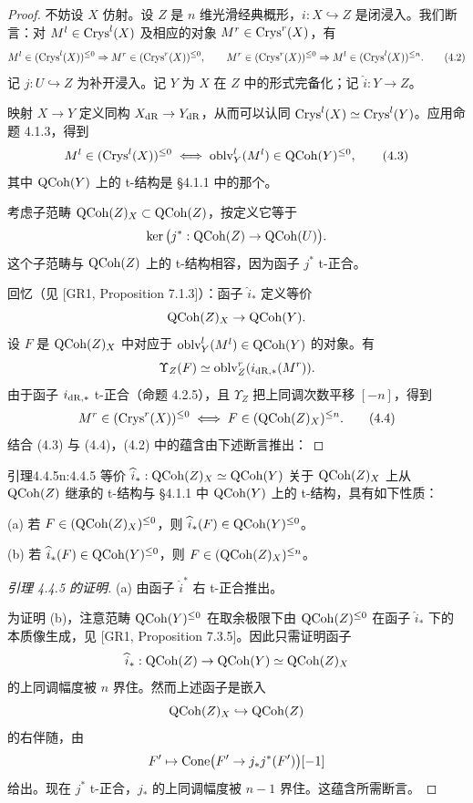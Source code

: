 \begin{proof}
不妨设 $X$ 仿射。设 $Z$ 是 $n$ 维光滑经典概形，$i:X\hookrightarrow Z$ 是闭浸入。我们断言：对 $M^l\in\mathrm{Crys}^l(X)$ 及相应的对象 $M^r\in\mathrm{Crys}^r(X)$，有
\begin{equation}
M^l\in(\mathrm{Crys}^l(X))^{\leq 0}\Rightarrow M^r\in(\mathrm{Crys}^r(X))^{\leq 0},\qquad
M^r\in(\mathrm{Crys}^r(X))^{\leq 0}\Rightarrow M^l\in(\mathrm{Crys}^l(X))^{\leq n}.\tag{4.2}
\end{equation}
记 $j:U\hookrightarrow Z$ 为补开浸入。记 $Y$ 为 $X$ 在 $Z$ 中的形式完备化；记 $\widehat{i}:Y\to Z$。

映射 $X\to Y$ 定义同构 $X_{\mathrm{dR}}\to Y_{\mathrm{dR}}$，从而可以认同 $\mathrm{Crys}^l(X)\simeq\mathrm{Crys}^l(Y)$。应用命题 4.1.3，得到
\begin{equation}
M^l\in(\mathrm{Crys}^l(X))^{\leq 0}\iff \mathrm{oblv}^l_Y(M^l)\in\mathrm{QCoh}(Y)^{\leq 0},\tag{4.3}
\end{equation}
其中 $\mathrm{QCoh}(Y)$ 上的 t-结构是 §4.1.1 中的那个。

考虑子范畴 $\mathrm{QCoh}(Z)_X\subset\mathrm{QCoh}(Z)$，按定义它等于
\[
\ker\big(j^*:\mathrm{QCoh}(Z)\to\mathrm{QCoh}(U)\big).
\]
这个子范畴与 $\mathrm{QCoh}(Z)$ 上的 t-结构相容，因为函子 $j^*$ t-正合。

回忆（见 [GR1, Proposition 7.1.3]）：函子 $\widehat{i}_*$ 定义等价
\[
\mathrm{QCoh}(Z)_X\to\mathrm{QCoh}(Y).
\]
设 $F$ 是 $\mathrm{QCoh}(Z)_X$ 中对应于 $\mathrm{oblv}^l_Y(M^l)\in\mathrm{QCoh}(Y)$ 的对象。有
\[
\Upsilon_Z(F)\simeq\mathrm{oblv}^r_Z(i_{\mathrm{dR},*}(M^r)).
\]
由于函子 $i_{\mathrm{dR},*}$ t-正合（命题 4.2.5），且 $\Upsilon_Z$ 把上同调次数平移 $[-n]$，得到
\begin{equation}
M^r\in(\mathrm{Crys}^r(X))^{\leq 0}\iff F\in(\mathrm{QCoh}(Z)_X)^{\leq n}.\tag{4.4}
\end{equation}
结合 (4.3) 与 (4.4)，(4.2) 中的蕴含由下述断言推出：
\end{proof}

\begin{othm}{引理}{4.4.5}{n:4.4.5}
等价 $\widehat{i}_*:\mathrm{QCoh}(Z)_X\simeq\mathrm{QCoh}(Y)$ 关于 $\mathrm{QCoh}(Z)_X$ 上从 $\mathrm{QCoh}(Z)$ 继承的 t-结构与 §4.1.1 中 $\mathrm{QCoh}(Y)$ 上的 t-结构，具有如下性质：

(a) 若 $F\in(\mathrm{QCoh}(Z)_X)^{\leq 0}$，则 $\widehat{i}_*(F)\in\mathrm{QCoh}(Y)^{\leq 0}$。

(b) 若 $\widehat{i}_*(F)\in\mathrm{QCoh}(Y)^{\leq 0}$，则 $F\in(\mathrm{QCoh}(Z)_X)^{\leq n}$。
\end{othm}

\begin{proof}[引理 4.4.5 的证明]
(a) 由函子 $\widehat{i}^*$ 右 t-正合推出。

为证明 (b)，注意范畴 $\mathrm{QCoh}(Y)^{\leq 0}$ 在取余极限下由 $\mathrm{QCoh}(Z)^{\leq 0}$ 在函子 $\widehat{i}_*$ 下的本质像生成，见 [GR1, Proposition 7.3.5]。因此只需证明函子
\[
\widehat{i}_*:\mathrm{QCoh}(Z)\to\mathrm{QCoh}(Y)\simeq\mathrm{QCoh}(Z)_X
\]
的上同调幅度被 $n$ 界住。然而上述函子是嵌入
\[
\mathrm{QCoh}(Z)_X\hookrightarrow\mathrm{QCoh}(Z)
\]
的右伴随，由
\[
F'\mapsto\mathrm{Cone}\big(F'\to j_*j^*(F')\big)[-1]
\]
给出。现在 $j^*$ t-正合，$j_*$ 的上同调幅度被 $n-1$ 界住。这蕴含所需断言。
\end{proof}

